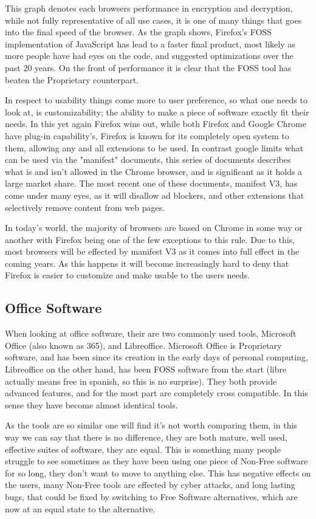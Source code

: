 \documentclass[a4paper,12pt]{article}
\begin{document}
{This graph denotes each browsers performance in encryption and decryption, while not fully representative of all use 
cases, it is one of many things that goes into the final speed of the browser. As the graph shows, Firefox's FOSS 
implementation of JavaScript has lead to a faster final product, most likely as more people have had eyes on the code, 
and suggested optimizations over the past 20 years. On the front of performance it is clear that the FOSS tool has beaten 
the Proprietary counterpart.

In respect to usability things come more to user preference, so what one needs to look at, is customizability; the ability 
to make a piece of software exactly fit their needs. In this yet again Firefox wins out, while both Firefox and Google Chrome 
have plug-in capability's, Firefox is known for its completely open system to them, allowing any and all extensions to be
used. In contrast google limits what can be used via the "manifest" documents, this series of documents describes what is
and isn't allowed in the Chrome browser, and is significant as it holds a large market share. The most recent one of these
documents, manifest V3\cite{MANIFESTv3}, has come under many eyes, as it will disallow ad blockers, and other extensions that selectively
remove content from web pages.

In today's world, the majority of browsers are based on Chrome in some way or another with Firefox being one of the few exceptions 
to this rule. Due to this, most browsers will be effected by manifest V3 as it comes into full effect in the coming years.
As this happens it will become increasingly hard to deny that Firefox is easier to customize and make usable to the users needs.

\subsection{Office Software}
When looking at office software, their are two commonly used tools, Microsoft Office (also known as 365), and Libreoffice.
Microsoft Office is Proprietary software, and has been since its creation in the early days of personal computing, Libreoffice 
on the other hand, has been FOSS software from the start (libre actually means free in spanish, so this is no surprise). 
They both provide advanced features, and for the most part are completely cross compatible. In this sense they have become
almost identical tools. 

As the tools are so similar one will find it's not worth comparing them, in this way we can say that there is no difference,
they are both mature, well used, effective suites of software, they are equal. This is something many people struggle to 
see sometimes as they have been using one piece of Non-Free software for so long, they don't want to move to anything else.
This has negative effects on the users, many Non-Free tools are effected by cyber attacks, and long lasting bugs, that could 
be fixed by switching to Free Software alternatives, which are now at an equal state to the alternative.

}
\end{document}
